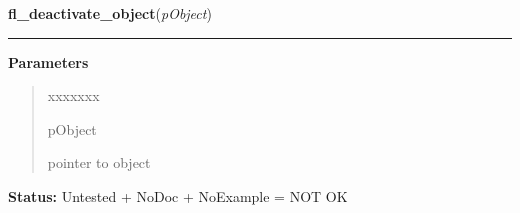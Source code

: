     \label{xformslib:library:fl_deactivate_object}

    \vspace{0.5ex}

\hspace{.8\funcindent}\begin{boxedminipage}{\funcwidth}

    \raggedright \textbf{fl\_deactivate\_object}(\textit{pObject})

    \vspace{-1.5ex}

    \rule{\textwidth}{0.5\fboxrule}
\setlength{\parskip}{2ex}
\setlength{\parskip}{1ex}
      \textbf{Parameters}
      \vspace{-1ex}

      \begin{quote}
        \begin{Ventry}{xxxxxxx}

          \item[pObject]

          pointer to object

        \end{Ventry}

      \end{quote}

\textbf{Status:} Untested + NoDoc + NoExample = NOT OK



    \end{boxedminipage}

    \label{xformslib:library:fl_object_is_active}

    \vspace{0.5ex}

